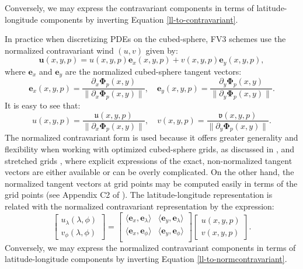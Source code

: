 Conversely, we may express the contravariant components in terms of
latitude-longitude components by inverting Equation \eqref{ll-to-contravariant}.

In practice when discretizing PDEs on the cubed-sphere, FV3 schemes use the normalized contravariant wind
$({u},{v})$ given by:
\begin{equation}
	\label{norm-contravariant-wind}
	\boldsymbol{u}(x, y, p) = 
	{u}(x, y, p) \boldsymbol{e}_x(x, y,p) + 
	{v}(x, y, p) \boldsymbol{e}_y(x, y,p),
\end{equation}
where $\boldsymbol{e}_x$ and $\boldsymbol{e}_y$ are the normalized cubed-sphere tangent vectors:
\begin{equation}
   \boldsymbol{e}_x(x,y,p)  = \frac{\partial_x\boldsymbol{\Phi}_p(x,y)}{\|\partial_x\boldsymbol{\Phi}_p(x,y)\|}, \quad
   \boldsymbol{e}_y(x,y,p)  = \frac{\partial_y\boldsymbol{\Phi}_p(x,y)}{\|\partial_y\boldsymbol{\Phi}_p(x,y)\|}.
\end{equation}
It is easy to see that:
\begin{equation}
	{u}(x,y,p)  = \frac{\mathfrak{u}(x,y,p)}{\|\partial_x\boldsymbol{\Phi}_p(x,y)\|}, \quad
	{v}(x,y,p)  = \frac{\mathfrak{v}(x,y,p)}{\|\partial_y\boldsymbol{\Phi}_p(x,y)\|}.
\end{equation}
The normalized contravariant form is used because it offers greater generality and flexibility when working with optimized cubed-sphere grids,
as discussed in \citet{putman:2007}, and stretched grids \citep{harris:2016}, 
where explicit expressions of the exact, non-normalized tangent vectors are either available or can be overly complicated.
On the other hand, the normalized tangent vectors at grid points may be computed easily in terms of the grid points (see Appendix C2 of \citet{chen:2021}).
The latitude-longitude representation is related with the normalized contravariant representation by the expression:
\begin{equation}
	\label{ll-to-normcontravariant}
	\begin{bmatrix}
		u_\lambda (\lambda, \phi) \\
		v_\phi (\lambda, \phi) 
	\end{bmatrix}
	=
	\begin{bmatrix}
		\langle 	\boldsymbol{e}_x, \boldsymbol{e}_\lambda \rangle 
		& \langle 	\boldsymbol{e}_y, \boldsymbol{e}_\lambda \rangle \\
		\langle 	\boldsymbol{e}_x, \boldsymbol{e}_\phi \rangle 
		& \langle 	\boldsymbol{e}_y, \boldsymbol{e}_\phi \rangle \\
	\end{bmatrix}
	\begin{bmatrix}
		{u}(x,y,p) \\
		{v}(x,y,p)
	\end{bmatrix}.
\end{equation}
Conversely, we may express the normalized contravariant components in terms of
latitude-longitude components by inverting Equation \eqref{ll-to-normcontravariant}.


